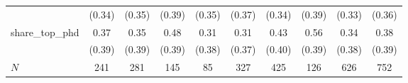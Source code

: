{\begin{tabular}{l*{9}{c}}
            &      (0.34)&      (0.35)&      (0.39)&      (0.35)&      (0.37)&      (0.34)&      (0.39)&      (0.33)&      (0.36)\\
share\_top\_phd&        0.37&        0.35&        0.48&        0.31&        0.31&        0.43&        0.56&        0.34&        0.38\\
            &      (0.39)&      (0.39)&      (0.39)&      (0.38)&      (0.37)&      (0.40)&      (0.39)&      (0.38)&      (0.39)\\
\hline
\(N\)       &         241&         281&         145&          85&         327&         425&         126&         626&         752\\
\hline\hline
\end{tabular}
}
